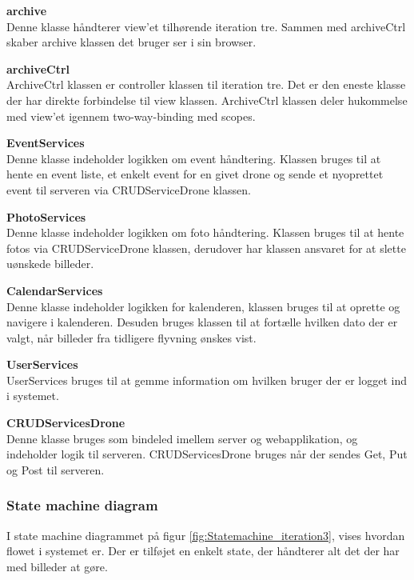\textbf{archive}\\
Denne klasse håndterer view'et tilhørende iteration tre. Sammen med archiveCtrl skaber archive klassen det bruger ser i sin browser.

\textbf{archiveCtrl}\\
ArchiveCtrl klassen er controller klassen til iteration tre. Det er den eneste klasse der har direkte forbindelse til view klassen. ArchiveCtrl klassen deler hukommelse med view'et igennem two-way-binding med scopes.

\textbf{EventServices}\\
Denne klasse indeholder logikken om event håndtering. Klassen bruges til at hente en event liste, et enkelt event for en givet drone og sende et nyoprettet event til serveren via CRUDServiceDrone klassen.

\textbf{PhotoServices}\\
Denne klasse indeholder logikken om foto håndtering. Klassen bruges til at hente fotos via CRUDServiceDrone klassen, derudover har klassen ansvaret for at slette uønskede billeder.
\newpage

\textbf{CalendarServices}\\
Denne klasse indeholder logikken for kalenderen, klassen bruges til at oprette og navigere i kalenderen. Desuden bruges klassen til at fortælle hvilken dato der er valgt, når  billeder fra tidligere flyvning ønskes vist.

\textbf{UserServices}\\
UserServices bruges til at gemme information om hvilken bruger der er logget ind i systemet.

\textbf{CRUDServicesDrone}\\
Denne klasse bruges som bindeled imellem server og webapplikation, og indeholder logik til serveren. CRUDServicesDrone bruges når der sendes Get, Put og Post til serveren.


\vspace{0.3cm}

\subsubsection*{State machine diagram}
\vspace{-0.3cm}
I state machine diagrammet på figur \ref{fig:Statemachine_iteration3}, vises hvordan flowet i systemet er. Der er tilføjet en enkelt state, der håndterer alt det der har med billeder at gøre. 

